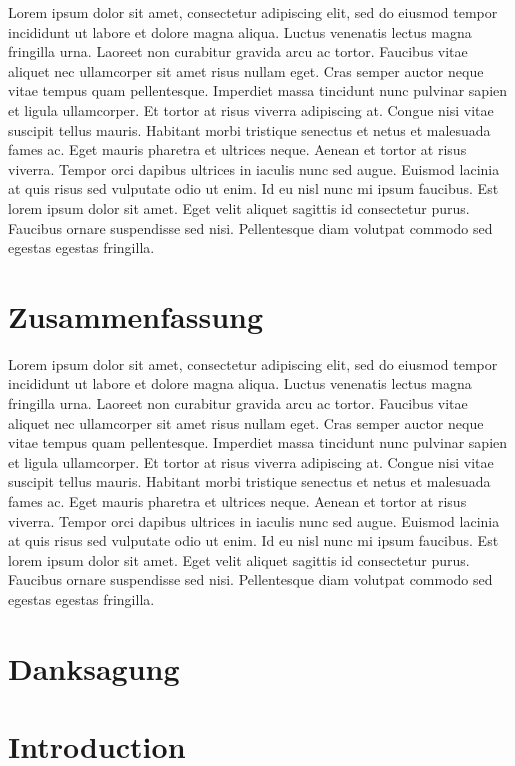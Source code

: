 \documentclass[
]{scrbook}
\begin{document}
Lorem ipsum dolor sit amet, consectetur adipiscing elit, sed do eiusmod tempor incididunt ut labore et dolore magna aliqua. Luctus venenatis lectus magna fringilla urna. Laoreet non curabitur gravida arcu ac tortor. Faucibus vitae aliquet nec ullamcorper sit amet risus nullam eget. Cras semper auctor neque vitae tempus quam pellentesque. Imperdiet massa tincidunt nunc pulvinar sapien et ligula ullamcorper. Et tortor at risus viverra adipiscing at. Congue nisi vitae suscipit tellus mauris. Habitant morbi tristique senectus et netus et malesuada fames ac. Eget mauris pharetra et ultrices neque. Aenean et tortor at risus viverra. Tempor orci dapibus ultrices in iaculis nunc sed augue. Euismod lacinia at quis risus sed vulputate odio ut enim. Id eu nisl nunc mi ipsum faucibus. Est lorem ipsum dolor sit amet. Eget velit aliquet sagittis id consectetur purus. Faucibus ornare suspendisse sed nisi. Pellentesque diam volutpat commodo sed egestas egestas fringilla.

\chapter{Zusammenfassung}\label{zusammenfassung}

Lorem ipsum dolor sit amet, consectetur adipiscing elit, sed do eiusmod tempor incididunt ut labore et dolore magna aliqua. Luctus venenatis lectus magna fringilla urna. Laoreet non curabitur gravida arcu ac tortor. Faucibus vitae aliquet nec ullamcorper sit amet risus nullam eget. Cras semper auctor neque vitae tempus quam pellentesque. Imperdiet massa tincidunt nunc pulvinar sapien et ligula ullamcorper. Et tortor at risus viverra adipiscing at. Congue nisi vitae suscipit tellus mauris. Habitant morbi tristique senectus et netus et malesuada fames ac. Eget mauris pharetra et ultrices neque. Aenean et tortor at risus viverra. Tempor orci dapibus ultrices in iaculis nunc sed augue. Euismod lacinia at quis risus sed vulputate odio ut enim. Id eu nisl nunc mi ipsum faucibus. Est lorem ipsum dolor sit amet. Eget velit aliquet sagittis id consectetur purus. Faucibus ornare suspendisse sed nisi. Pellentesque diam volutpat commodo sed egestas egestas fringilla.

\chapter{Danksagung}\label{danksagung}

\mainmatter

\chapter{Introduction}\label{introduction}
\end{document}
